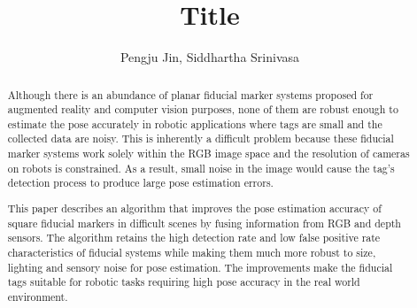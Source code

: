 \documentclass[letterpaper,conference,10pt]{ieeetran}
\begin{document}
\title{\vspace{0.20in}\LARGE Title}

\author{Pengju Jin, Siddhartha Srinivasa}
\maketitle 	

\begin{abstract}
Although there is an abundance of planar fiducial marker systems proposed for augmented reality and computer vision purposes, none of them are robust enough to estimate the pose accurately in robotic applications where tags are small and the collected data are noisy. This is inherently a difficult problem because these fiducial marker systems work solely within the RGB image space and the resolution of cameras on robots is constrained. As a result, small noise in the image would cause the tag's detection process to produce large pose estimation errors. 

This paper describes an algorithm that improves the pose estimation accuracy of square fiducial markers in difficult scenes by fusing information from RGB and depth sensors. The algorithm retains the high detection rate and low false  positive rate characteristics of fiducial systems while making them much more robust to size, lighting and sensory noise for pose estimation. The improvements make the fiducial tags suitable for robotic tasks requiring high pose accuracy in the real world environment.
\end{abstract}

\IEEEpeerreviewmaketitle













\footnotesize{


}
\end{document}
